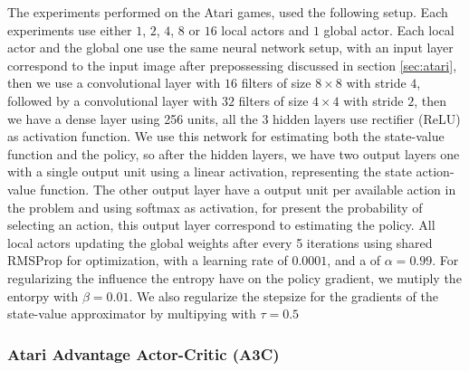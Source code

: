 \documentclass[11pt]{article}
\begin{document}
The experiments performed on the Atari games, used the following setup. Each experiments use either $1$, $2$, $4$, $8$ or $16$ local actors and $1$ global actor. Each local actor and the global one use the same neural network setup, with an input layer correspond to the input image after prepossessing discussed in section \ref{sec:atari}, then we use a convolutional layer with $16$ filters of size $8 \times 8$ with stride $4$, followed by a convolutional layer with $32$ filters of size $4 \times 4$ with stride $2$, then we have a dense layer using 256 units, all the 3 hidden layers use rectifier (ReLU) as activation function. We use this network for estimating both the state-value function and the policy, so after the hidden layers, we have two output layers one with a single output unit using a linear activation, representing the state action-value function. The other output layer have a output unit per available action in the problem and using softmax as activation, for present the probability of selecting an action, this output layer correspond to estimating the policy. All local actors updating the global weights after every 5 iterations using shared RMSProp for optimization, with a learning rate of $0.0001$, and a of $\alpha = 0.99$. For regularizing the influence the entropy have on the policy gradient, we mutiply the entorpy with $\beta = 0.01$. We also regularize the stepsize for the gradients of the state-value approximator by multipying with $\tau = 0.5$




\subsubsection{Atari Advantage Actor-Critic (A3C)}
\end{document}
